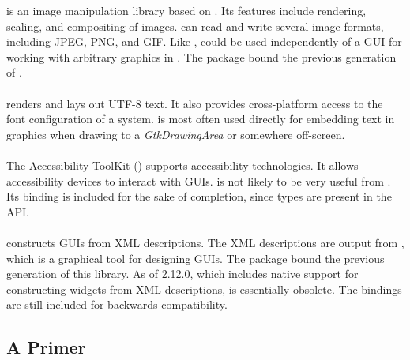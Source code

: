 \documentclass[article]{jss}
\begin{document}
 is an image manipulation library based on . Its features
include rendering, scaling, and compositing of images.  can read
and write several image formats, including JPEG, PNG, and GIF. Like ,
 could be used independently of a GUI for working with arbitrary 
graphics in . The  \citep{RGdkPixbuf} package bound
the previous generation of .

\paragraph[Pango]{}

 renders and lays out UTF-8 text. It also
provides cross-platform access to the font configuration of a system.
 is most often used directly for embedding text in graphics when drawing
to a \emph{GtkDrawingArea} or somewhere off-screen.

\paragraph[ATK]{} 

The Accessibility ToolKit () supports accessibility technologies. 
It allows accessibility devices to interact with  GUIs. 
is not likely to be very useful from . Its binding is included for the 
sake of completion, since  types are present in the  API.

\paragraph[Libglade]{}

 constructs  GUIs from XML descriptions.
The XML descriptions are output from
, which is a graphical tool for designing GUIs. The 
package \citep{RGtkGlade} bound the previous generation of this library. As of 
 2.12.0, which includes native support for constructing widgets from 
XML descriptions,  is essentially obsolete. The bindings are
still included for backwards compatibility.

\subsection[A GObject Primer]{A  Primer}\label{sec:primer}
\end{document}
